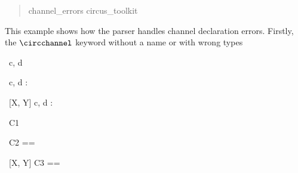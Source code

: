 \documentclass{article}
\newenvironment{zsection}{\begin{quotation}}{\end{quotation}}
\begin{document}
\begin{zsection}
   \SECTION channel\_errors \parents circus\_toolkit
\end{zsection}

This example shows how the parser handles channel declaration errors.
Firstly, the $\circchannel$ keyword without a name or with wrong types
%
\begin{circus}
    \circchannel
\end{circus}
%
\begin{cirucs}
    \circchannelfrom
\end{cirucs}
%
\begin{circus}
   \circchannel\ c, d \someunknowncmd
\end{circus}
%
\begin{circus}
   \circchannel\ c, d : \\
\end{circus}
%
\begin{circus}
   \circchannel\ [X, Y] c, d : \\
\end{circus}

\begin{circus}
    \circchannelset 
\end{circus}

\begin{circus}
    \circchannelset\ C1 \\ 
\end{circus}

\begin{circus}
    \circchannelset\ C2 == \\
\end{circus}
\begin{circus}
    \circchannelset\ [X, Y] C3 == 
\end{circus}
\end{document}
